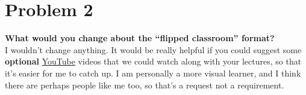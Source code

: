 \documentclass[11pt]{article}
\begin{document}
\section*{Problem 2}
\textbf{What would you change about the “flipped classroom” format?}
\\ I wouldn't change anything. It would be really helpful if you could suggest some \textbf{optional} \href{https://youtube.com}{YouTube} videos that we could watch along with your lectures, so that it's easier for me to catch up. I am personally a more visual learner, and I think there are perhaps people like me too, so that's a request not a requirement.
\end{document}
